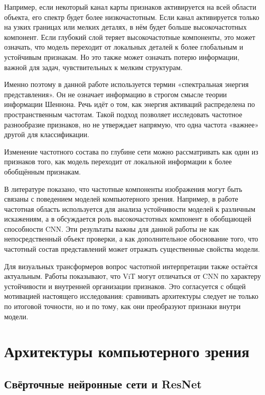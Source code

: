 Например, если некоторый канал карты признаков активируется на всей области объекта, его спектр будет более низкочастотным. Если канал активируется только на узких границах или мелких деталях, в нём будет больше высокочастотных компонент. Если глубокий слой теряет высокочастотные компоненты, это может означать, что модель переходит от локальных деталей к более глобальным и устойчивым признакам. Но это также может означать потерю информации, важной для задач, чувствительных к мелким структурам.

Именно поэтому в данной работе используется термин «спектральная энергия представления». Он не означает информацию в строгом смысле теории информации Шеннона. Речь идёт о том, как энергия активаций распределена по пространственным частотам. Такой подход позволяет исследовать частотное разнообразие признаков, но не утверждает напрямую, что одна частота «важнее» другой для классификации.

Изменение частотного состава по глубине сети можно рассматривать как один из признаков того, как модель переходит от локальной информации к более обобщённым признакам.

В литературе показано, что частотные компоненты изображения могут быть связаны с поведением моделей компьютерного зрения. Например, в работе \cite{yin2019fourier} частотная область используется для анализа устойчивости моделей к различным искажениям, а в \cite{wang2020highfrequency} обсуждается роль высокочастотных компонент в обобщающей способности CNN. Эти результаты важны для данной работы не как непосредственный объект проверки, а как дополнительное обоснование того, что частотный состав представлений может отражать существенные свойства модели.

Для визуальных трансформеров вопрос частотной интерпретации также остаётся актуальным. Работы \cite{naseer2021intriguing,paul2022vision,alijani2024vision} показывают, что ViT могут отличаться от CNN по характеру устойчивости и внутренней организации признаков. Это согласуется с общей мотивацией настоящего исследования: сравнивать архитектуры следует не только по итоговой точности, но и по тому, как они преобразуют признаки внутри модели.


\section{Архитектуры компьютерного зрения}

\subsection{Свёрточные нейронные сети и ResNet}

